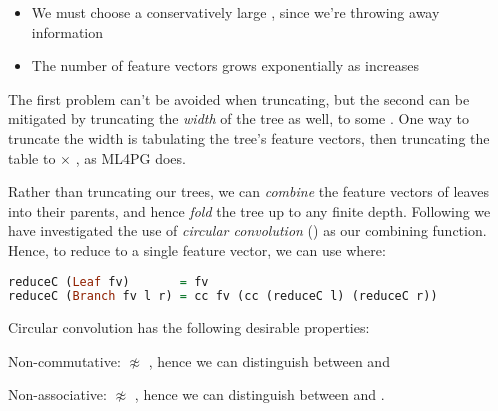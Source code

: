\documentclass[]{article}
\begin{document}
\begin{itemize}
 \item We must choose a conservatively large , since we're throwing away information
 \item The number of feature vectors grows exponentially as  increases
\end{itemize}

The first problem can't be avoided when truncating, but the second can be mitigated by truncating the \emph{width} of the tree as well, to some . One way to truncate the width is tabulating the tree's feature vectors, then truncating the table to  $\times$ , as ML4PG does.

\iffalse

We can do this with \hs{tabulate w d t}:

\begin{lstlisting}[language=Haskell, xleftmargin=.2\textwidth, xrightmargin=.2\textwidth]
tabulate w d t = take d (map (take w) (tabulate' t))

tabulate' (Leaf   fv)     = [fv] : []
tabulate' (Branch fv l r) = [fv] : merge (tabulate' l) (tabulate' r)

merge    []     ys  = ys
merge    xs     []  = xs
merge (x:xs) (y:ys) = (x ++ y) : merge xs ys
\end{lstlisting}

\fi

Rather than truncating our trees, we can \emph{combine} the feature vectors of leaves into their parents, and hence \emph{fold} the tree up to any finite depth. Following \cite{zanzotto2012distributed} we have investigated the use of \emph{circular convolution} () as our combining function. Hence, to reduce  to a single feature vector, we can use  where:

\begin{lstlisting}[language=Haskell, xleftmargin=.2\textwidth, xrightmargin=.2\textwidth]
reduceC (Leaf fv)       = fv
reduceC (Branch fv l r) = cc fv (cc (reduceC l) (reduceC r))
\end{lstlisting}

Circular convolution has the following desirable properties:

\begin{description}

  \item{Non-commutative}:  $\not\approx$ , hence we can distinguish between  and 

  \item{Non-associative}:  $\not\approx$ , hence we can distinguish between  and .

\end{description}
\end{document}

